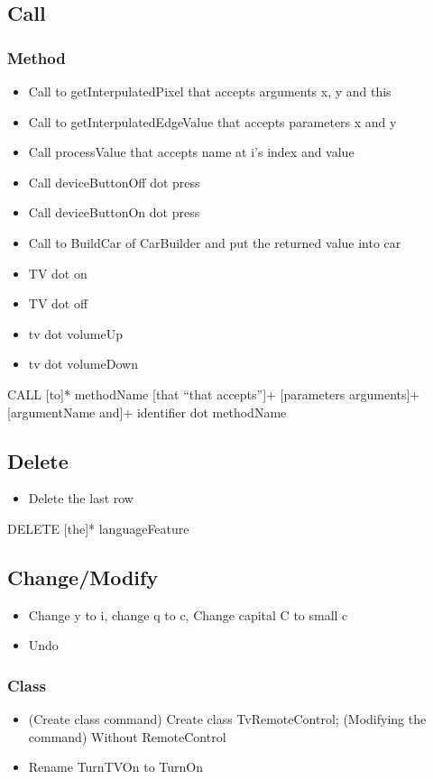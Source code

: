 \subsection{Call}
\subsubsection{Method}
\begin{itemize}
	\item Call to getInterpulatedPixel that accepts arguments x, y and this
	\item Call to getInterpulatedEdgeValue that accepts parameters x and y
	\item Call processValue that accepts name at i’s index and value
	\item Call deviceButtonOff dot press
	\item Call deviceButtonOn dot press
	\item Call to BuildCar of CarBuilder and put the returned value into car
	\item TV dot on
	\item TV dot off
	\item tv dot volumeUp
	\item tv dot volumeDown
\end{itemize}
CALL [to]* methodName [that “that accepts”]+ [parameters arguments]+ [argumentName and]+
identifier dot methodName
\subsection{Delete}
\begin{itemize}
	\item Delete the last row
\end{itemize}
DELETE [the]* languageFeature
\subsection{Change/Modify}
\begin{itemize}
	\item Change y to i, change q to c, Change capital C to small c
	\item Undo
\end{itemize}
\subsubsection{Class}
\begin{itemize}
	\item (Create class command) Create class TvRemoteControl; (Modifying the command) Without RemoteControl
	\item Rename TurnTVOn to TurnOn
\end{itemize}
